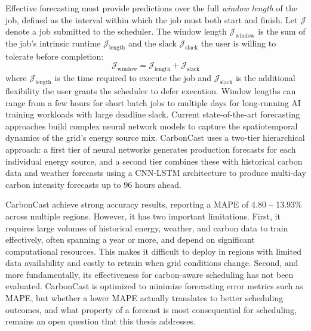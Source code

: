 Effective forecasting must provide predictions over the full \textit{window length} of the job, defined as the interval within which the job must both start and finish.
Let $\mathcal{J}$ denote a job submitted to the scheduler.
The window length $\mathcal{J}_{\text{window}}$ is the sum of the job's intrinsic runtime $\mathcal{J}_{\text{length}}$ and the slack $\mathcal{J}_{\text{slack}}$ the user is willing to tolerate before completion:
\begin{equation}
    \mathcal{J}_{\text{window}} = \mathcal{J}_{\text{length}} + \mathcal{J}_{\text{slack}}
\end{equation}
where $\mathcal{J}_{\text{length}}$ is the time required to execute the job and $\mathcal{J}_{\text{slack}}$ is the additional flexibility the user grants the scheduler to defer execution.
Window lengths can range from a few hours for short batch jobs to multiple days for long-running AI training workloads with large deadline slack.
Current state-of-the-art forecasting approaches build complex neural network models to capture the spatiotemporal dynamics of the grid's energy source mix.
CarbonCast \cite{maji_carboncast_2022} uses a two-tier hierarchical approach: a first tier of neural networks generates production forecasts for each individual energy source, and a second tier combines these with historical carbon data and weather forecasts using a CNN-LSTM architecture to produce multi-day carbon intensity forecasts up to 96 hours ahead.

CarbonCast achieve strong accuracy results, reporting a MAPE of 4.80 -- 13.93\% across multiple regions.
However, it has two important limitations.
First, it requires large volumes of historical energy, weather, and carbon data to train effectively, often spanning a year or more, and depend on significant computational resources.
This makes it difficult to deploy in regions with limited data availability and costly to retrain when grid conditions change.
Second, and more fundamentally, its effectiveness for carbon-aware scheduling has not been evaluated.
CarbonCast is optimized to minimize forecasting error metrics such as MAPE, but whether a lower MAPE actually translates to better scheduling outcomes, and what property of a forecast is most consequential for scheduling, remains an open question that this thesis addresses.
